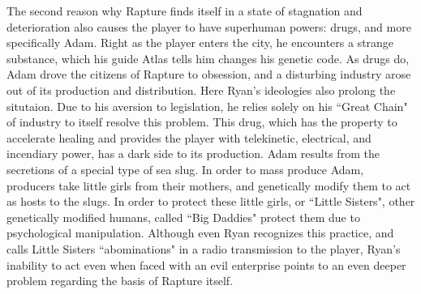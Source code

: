 \documentclass{article}
\begin{document}
The second reason why Rapture finds itself in a state of stagnation and deterioration also causes the player
to have superhuman powers: drugs, and more specifically Adam. Right as the player enters the city, he 
encounters a strange substance, which his guide Atlas tells him changes his genetic code. As drugs do, Adam 
drove the citizens of Rapture to obsession, and a disturbing industry arose out of its production and 
distribution. Here Ryan's ideologies also prolong the situtaion. Due to his aversion to legislation, he relies
solely on his ``Great Chain" of industry to itself resolve this problem. This drug, which has the property to 
accelerate healing and provides the player with telekinetic, electrical, and incendiary power, has a dark side 
to its  production. Adam results from the secretions of a special type of sea slug. In order to mass produce
Adam, producers take little girls from their mothers, and genetically modify them to act as hosts to the slugs. 
In order to protect these little girls, or ``Little Sisters", other genetically modified humans, called
``Big Daddies" protect them due to psychological manipulation. Although even Ryan recognizes this practice,
and calls Little Sisters ``abominations" in a radio transmission to the player, Ryan's inability to act even 
when faced with an evil enterprise points to an even deeper problem regarding the basis of Rapture itself. 
\end{document}

